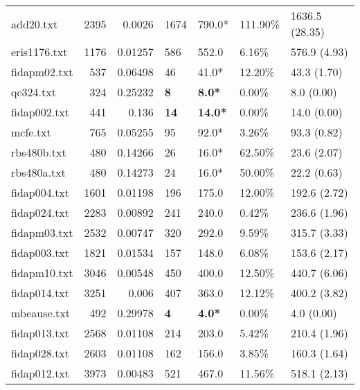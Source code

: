 \begin{table}[h]
\begin{tabular}{lrrllll}
 add20.txt          &    2395 &     0.0026  & 1674         & 790.0*          & 111.90\% & 1636.5 (28.35) \\
 eris1176.txt       &    1176 &     0.01257 & 586          & 552.0           & 6.16\%   & 576.9 (4.93)   \\
 fidapm02.txt       &     537 &     0.06498 & 46           & 41.0*           & 12.20\%  & 43.3 (1.70)    \\
 qc324.txt          &     324 &     0.25232 & \textbf{8}   & \textbf{8.0*}   & 0.00\%   & 8.0 (0.00)     \\
 fidap002.txt       &     441 &     0.136   & \textbf{14}  & \textbf{14.0*}  & 0.00\%   & 14.0 (0.00)    \\
 mcfe.txt           &     765 &     0.05255 & 95           & 92.0*           & 3.26\%   & 93.3 (0.82)    \\
 rbs480b.txt        &     480 &     0.14266 & 26           & 16.0*           & 62.50\%  & 23.6 (2.07)    \\
 rbs480a.txt        &     480 &     0.14273 & 24           & 16.0*           & 50.00\%  & 22.2 (0.63)    \\
 fidap004.txt       &    1601 &     0.01198 & 196          & 175.0           & 12.00\%  & 192.6 (2.72)   \\
 fidap024.txt       &    2283 &     0.00892 & 241          & 240.0           & 0.42\%   & 236.6 (1.96)   \\
 fidapm03.txt       &    2532 &     0.00747 & 320          & 292.0           & 9.59\%   & 315.7 (3.33)   \\
 fidap003.txt       &    1821 &     0.01534 & 157          & 148.0           & 6.08\%   & 153.6 (2.17)   \\
 fidapm10.txt       &    3046 &     0.00548 & 450          & 400.0           & 12.50\%  & 440.7 (6.06)   \\
 fidap014.txt       &    3251 &     0.006   & 407          & 363.0           & 12.12\%  & 400.2 (3.82)   \\
 mbeause.txt        &     492 &     0.29978 & \textbf{4}   & \textbf{4.0*}   & 0.00\%   & 4.0 (0.00)     \\
 fidap013.txt       &    2568 &     0.01108 & 214          & 203.0           & 5.42\%   & 210.4 (1.96)   \\
 fidap028.txt       &    2603 &     0.01108 & 162          & 156.0           & 3.85\%   & 160.3 (1.64)   \\
 fidap012.txt       &    3973 &     0.00483 & 521          & 467.0           & 11.56\%  & 518.1 (2.13)   \\

\end{tabular}
\end{table}
